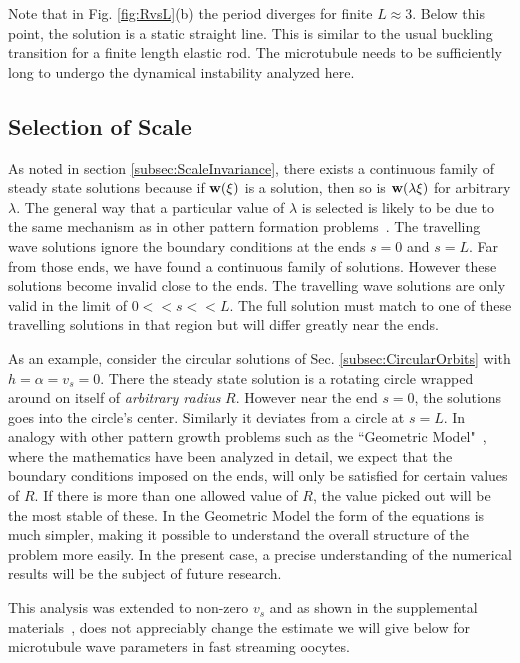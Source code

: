 \documentclass[11pt]{ucthesis}
\def\bw{{\bf w}}
\begin{document}
Note that in Fig. \ref{fig:RvsL}(b) the period diverges for finite $L \approx 3$. Below this
point, the solution is a static straight line. This is similar to the usual buckling transition
for a finite length elastic rod. The microtubule needs to be sufficiently long to undergo
the dynamical instability analyzed here. 


\subsection{Selection of Scale}

As noted in section \ref{subsec:ScaleInvariance}, there exists
a continuous family of steady state solutions because  if
$\bw(\xi)$ is a solution, then so is $\bw(\lambda \xi)$ for arbitrary
$\lambda$. The general way that a particular value of $\lambda$ is selected
is likely to be due to the same mechanism as in other pattern formation
problems~\cite{Kessler,Barbieri}. The travelling wave solutions ignore the
boundary conditions at the ends $s=0$ and $s=L$.  Far from those ends,
we have found a continuous family of solutions. However these solutions
become invalid close to the ends.  The travelling wave solutions are
only valid in the limit of $0 << s << L$. The full solution must match
to one of these travelling solutions in that region but will differ
greatly near the ends.

As an example, consider the circular solutions of
Sec. \ref{subsec:CircularOrbits} with $h = \alpha = v_s = 0$. There the
steady state solution is a rotating circle wrapped around on itself of
{\em arbitrary radius} $R$.  However near the end $s=0$, the solutions
goes into the circle's center. Similarly it deviates from a circle
at $s=L$.  In analogy with other pattern growth problems such as the
``Geometric Model"~\cite{Kessler},  where the mathematics have been analyzed
in detail, we expect that the boundary conditions imposed on the ends,
will only be satisfied for certain values of $R$. If there is more than
one allowed value of $R$, the value picked out will be the most stable of
these. In the Geometric Model the form of the equations is much simpler,
making it possible to understand the overall structure of the problem
more easily. In the present case, a precise understanding of the numerical
results will be the subject of future research.


This analysis was extended to non-zero $v_s$ and as shown in the supplemental materials~\cite{SupplMat}, does not
appreciably change the estimate we will give below for microtubule wave parameters in fast streaming oocytes. 
\end{document}
